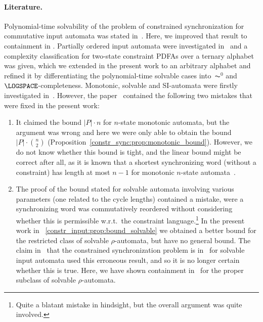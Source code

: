 
\paragraph{Literature.} Polynomial-time solvability  of the problem of constrained syn\-chro\-ni\-za\-tion for commutative input automata
was stated in~\cite{DBLP:journals/tcs/Hoffmann21}. Here, we improved that result
to containment in \NL.
Partially ordered input automata were investigated in~\cite{DBLP:conf/dlt/Hoffmann21a}
and a complexity classification for two-state constraint PDFAs over a ternary alphabet
was given, which we extended in the present work to an arbitrary alphabet and
refined it by differentiating the polynomial-time solvable cases into~$\AC^0$ and~$\LOGSPACE$-completeness. Monotonic, solvable and SI-automata
were firstly investigated  in~\cite{DBLP:conf/wia/Hoffmann22}. However, the paper~\cite{DBLP:conf/wia/Hoffmann22} contained
the following two mistakes that were fixed in the present work: 
\begin{enumerate}	
	\item It claimed the bound $|P| \cdot n$
	for $n$-state monotonic automata, but the argument was wrong and here we were only able to obtain 
	the bound $|P|\cdot \binom{n}{2}$ (Proposition~\ref{constr_sync:prop:monotonic_bound}). However, we do not know
	whether this bound is tight, and the linear bound might be correct after all,
	as it is known that a shortest synchronizing word (without a constraint) has length at most $n-1$
	for monotonic $n$-state automata~\cite{DBLP:journals/tcs/AnanichevV04}.
	
	\item The proof of the 
	bound stated for solvable automata involving various parameters (one related to the cycle lengths)
	contained a mistake, were a synchronizing word was commutatively reordered
	without considering whether this is permissible w.r.t.~the constraint language.\footnote{Quite a blatant mistake in hindsight, but the overall
	argument was quite involved.} In the present work in \THM~\ref{constr_input:prop:bound_solvable} we obtained a better bound
	for the restricted class of solvable $\rho$-automata, but have no general bound.
	The claim in~\cite{DBLP:conf/dlt/Hoffmann21a} that the constrained synchronization problem is in \NP\ 
	for solvable input automata used this erroneous result, and so it is no longer
	certain whether this is true.
	Here, we have shown containment in \NP\ for the proper subclass of solvable $\rho$-automata.
\end{enumerate} 

